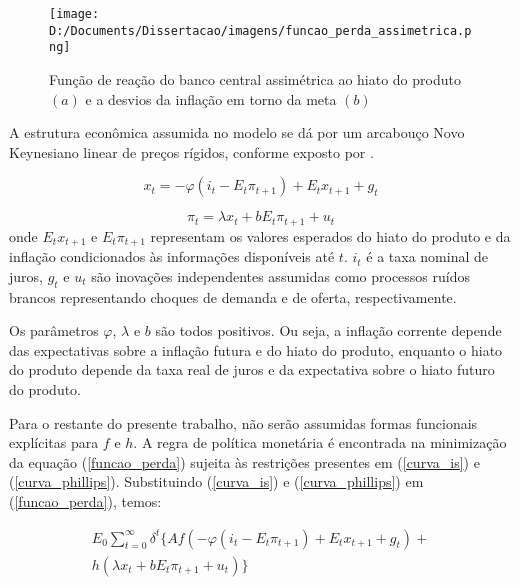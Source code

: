 \documentclass[
	article,			%
	11pt,				%
	oneside,			%
	a4paper,			%
	english,			%
	brazil,				%
	]{abntex2}
\begin{document}
	\hfill \break
	\hfill \break
	\hfill \break
	\hfill \break
	\hfill \break

	\begin{figure}[!h]
	\texttt{[image: D:/Documents/Dissertacao/imagens/funcao\_perda\_assimetrica.png]}
	\caption{Função de reação do banco central assimétrica ao hiato do \protect\linebreak produto $(a)$ e a desvios da inflação em torno da meta $(b)$}
	\label{fig:funcao_reacao_assimetrica}
	\end{figure}
	
	A estrutura econômica assumida no modelo se dá por um arcabouço Novo Keynesiano linear de preços rígidos, conforme exposto por .
		
	\begin{equation}  \label{curva_is}
		x_t=-\varphi(i_t-E_t\pi_{t+1}) + E_tx_{t+1} + g_t
	\end{equation}
	
	\begin{equation} \label{curva_phillips}
		\pi_t = \lambda x_t + bE_t\pi_{t+1} + u_t
	\end{equation}
%
	onde $E_tx_{t+1}$ e $E_t\pi_{t+1}$ representam os valores esperados do hiato do produto e da inflação condicionados às informações disponíveis até $t$. $i_t$ é a taxa nominal de juros, $g_t$ e $u_t$ são inovações independentes assumidas como processos ruídos brancos representando choques de demanda e de oferta, respectivamente. 
	
	Os parâmetros $\varphi$, $\lambda$ e $b$ são todos positivos. Ou seja, a inflação corrente depende das expectativas sobre a inflação futura e do hiato do produto, enquanto o hiato do produto depende da taxa real de juros e da expectativa sobre o hiato futuro do produto.
	
	Para o restante do presente trabalho, não serão assumidas formas funcionais explícitas para $f$ e $h$. A regra de política monetária é encontrada na minimização da equação (\ref{funcao_perda}) sujeita às restrições presentes em (\ref{curva_is}) e (\ref{curva_phillips}). Substituindo (\ref{curva_is}) e (\ref{curva_phillips}) em (\ref{funcao_perda}), temos:
	
	\begin{eqnarray} \label{problem_min}
		E_0\sum_{t=0}^{\infty}\delta^t \{ Af(-\varphi(i_t-E_t\pi_{t+1}) + E_tx_{t+1} + g_t) +\nonumber \\ h(\lambda x_t + bE_t\pi_{t+1} + u_t) \}
	\end{eqnarray}
	
\end{document}

